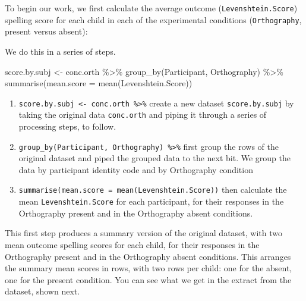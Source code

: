 \documentclass[
  letterpaper,
  DIV=11,
  numbers=noendperiod]{scrreprt}
\newenvironment{Shaded}{\begin{snugshade}}{\end{snugshade}}
\newcommand{\AttributeTok}[1]{\textcolor[rgb]{0.40,0.45,0.13}{#1}}
\newcommand{\FunctionTok}[1]{\textcolor[rgb]{0.28,0.35,0.67}{#1}}
\newcommand{\NormalTok}[1]{\textcolor[rgb]{0.00,0.23,0.31}{#1}}
\newcommand{\OtherTok}[1]{\textcolor[rgb]{0.00,0.23,0.31}{#1}}
\newcommand{\SpecialCharTok}[1]{\textcolor[rgb]{0.37,0.37,0.37}{#1}}
\providecommand{\tightlist}{%
  \setlength{\itemsep}{0pt}\setlength{\parskip}{0pt}}\usepackage{longtable,booktabs,array}
\begin{document}
To begin our work, we first calculate the average outcome
(\texttt{Levenshtein.Score}) spelling score for each child in each of
the experimental conditions (\texttt{Orthography}, present versus
absent):

We do this in a series of steps.

\begin{Shaded}
\begin{Highlighting}[numbers=left,,]
\NormalTok{score.by.subj }\OtherTok{\textless{}{-}}\NormalTok{ conc.orth }\SpecialCharTok{\%\textgreater{}\%}
  \FunctionTok{group\_by}\NormalTok{(Participant, Orthography) }\SpecialCharTok{\%\textgreater{}\%}
  \FunctionTok{summarise}\NormalTok{(}\AttributeTok{mean.score =} \FunctionTok{mean}\NormalTok{(Levenshtein.Score))}
\end{Highlighting}
\end{Shaded}

\begin{enumerate}
\def\labelenumi{\arabic{enumi}.}
\tightlist
\item
  \texttt{score.by.subj\ \textless{}-\ conc.orth\ \%\textgreater{}\%}
  create a new dataset \texttt{score.by.subj} by taking the original
  data \texttt{conc.orth} and piping it through a series of processing
  steps, to follow.
\item
  \texttt{group\_by(Participant,\ Orthography)\ \%\textgreater{}\%}
  first group the rows of the original dataset and piped the grouped
  data to the next bit. We group the data by participant identity code
  and by Orthography condition
\item
  \texttt{summarise(mean.score\ =\ mean(Levenshtein.Score))} then
  calculate the mean \texttt{Levenshtein.Score} for each participant,
  for their responses in the Orthography present and in the Orthography
  absent conditions.
\end{enumerate}

This first step produces a summary version of the original dataset, with
two mean outcome spelling scores for each child, for their responses in
the Orthography present and in the Orthography absent conditions. This
arranges the summary mean scores in rows, with two rows per child: one
for the absent, one for the present condition. You can see what we get
in the extract from the dataset, shown next.
\end{document}
